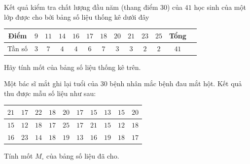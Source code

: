 \begin{bt}%
	Kết quả kiểm tra  chất lượng đầu năm (thang điểm $30$) của $41$ học sinh của một lớp được cho bởi bảng số liệu thống kê dưới đây
	\begin{center}
		\begin{tabular}{|c|c|c|c|c|c|c|c|c|c|c|c|c|}
			\hline 
			Điểm & $9$ & $11$ & $14$ & $16$ & $17$ & $18$ & $20$  & $21$ & $23$ & $25$ & Tổng \\
			\hline 
			Tần số & $3$ &  $7$ & $4$ & $4$ & $6$ & $7$ & $3$ & $3$ & $2$ & $2$ & $41$ \\
			 \hline
		\end{tabular}
	\end{center}
	Hãy tính mốt của bảng số  liệu thống kê trên.
\end{bt}

\begin{bt}%
	Một bác sĩ mắt ghi lại tuổi của 30 bệnh nhân mắc bệnh đau mắt hột. Kết quả thu được mẫu số liệu  như sau:
	\begin{center}
		\begin{tabular}{|c|c|c|c|c|c|c|c|c|c|}
			\hline 
			$21$ & $17$ & $22$ & $18$ & $20$ & $17$ & $15$ & $13$ & $15$ &  $20$ \\
			 \hline
			$15$ & $12$ & $18$ & $17$ & $25$ &  $17$ & $21$ & $15$ & $12$ & $18$ \\
			\hline 
			$16$ & $23$ & $14$ &  $18$ & $19$ & $13$ & $16$ & $19$ & $18$ & $17$ \\
			 \hline
		\end{tabular}
	\end{center}
	Tính mốt $M_\circ$ của  bảng số liệu đã cho.
\end{bt}

